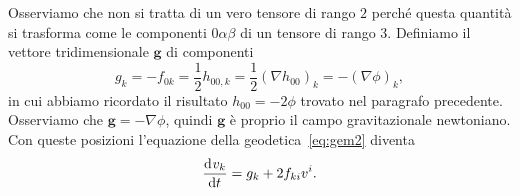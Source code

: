 Osserviamo che non si tratta di un vero tensore di rango $2$ perché questa
quantità si trasforma come le componenti $0\alpha\beta$ di un tensore di rango
$3$.  Definiamo il vettore tridimensionale $\bm{g}$ di componenti
\begin{equation}
  g_{k} = -f_{0k} = \frac{1}{2}h_{00,k} = \frac{1}{2}(\nabla h_{00})_{k} =
  -(\nabla \phi)_{k},
\end{equation}
in cui abbiamo ricordato il risultato $h_{00} = -2\phi$ trovato nel paragrafo
precedente.  Osserviamo che $\bm{g} = -\nabla \phi$, quindi $\bm{g}$ è proprio
il campo gravitazionale newtoniano.  Con queste posizioni l'equazione della
geodetica~\eqref{eq:gem2} diventa
\begin{equation}
  \label{eq:gem3}
  \frac{{\mathop{}\!\mathrm{d}^{}}v_{k}}{\mathop{}\!\mathrm{d} {t}^{}} = g_{k} + 2f_{ki}v^{i}.
\end{equation}

